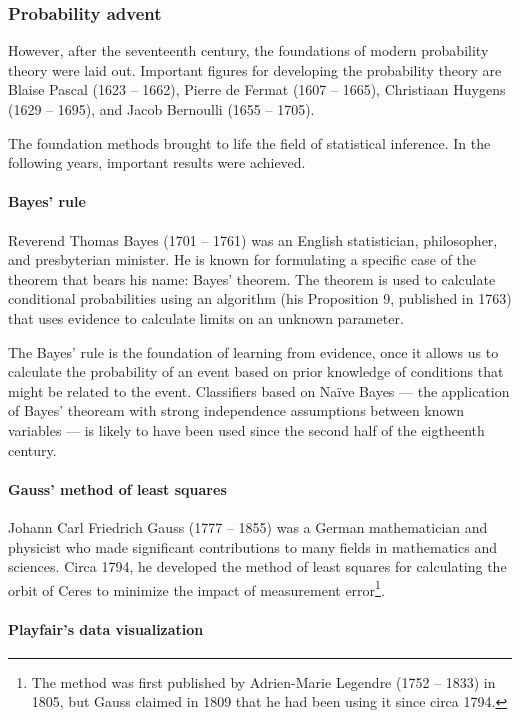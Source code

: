\subsubsection{Probability advent}

However, after the seventeenth century, the foundations of modern probability theory were
laid out.  Important figures for developing the probability theory are Blaise Pascal (1623
-- 1662), Pierre de Fermat (1607 -- 1665), Christiaan Huygens (1629 -- 1695), and Jacob
Bernoulli (1655 -- 1705).

The foundation methods brought to life the field of statistical inference. In the
following years, important results were achieved.

\paragraph{Bayes' rule}

Reverend Thomas Bayes (1701 -- 1761) was an English statistician, philosopher, and
presbyterian minister.  He is known for formulating a specific case of the theorem that
bears his name: Bayes' theorem.  The theorem is used to calculate conditional
probabilities using an algorithm (his Proposition 9, published in 1763) that uses evidence to calculate
limits on an unknown parameter.

The Bayes' rule is the foundation of learning from evidence, once it allows us to
calculate the probability of an event based on prior knowledge of conditions that might be
related to the event.  Classifiers based on Naïve Bayes --- the application of Bayes'
theoream with strong independence assumptions between known variables --- is likely to have
been used since the second half of the eigtheenth century.

\paragraph{Gauss' method of least squares}

Johann Carl Friedrich Gauss (1777 -- 1855) was a German mathematician and physicist who made
significant contributions to many fields in mathematics and sciences.  Circa 1794, he
developed the method of least squares for calculating the orbit of Ceres to minimize the
impact of measurement error\footnote{The method was first published by Adrien-Marie
Legendre (1752 -- 1833) in 1805, but Gauss claimed in 1809 that he
had been using it since circa 1794.}.

\paragraph{Playfair's data visualization}

